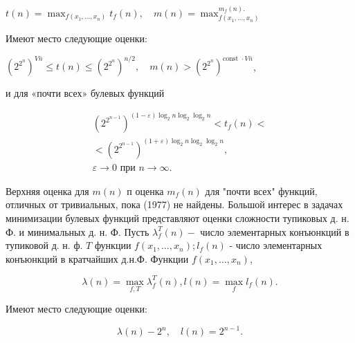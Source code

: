 \documentclass[10pt]{article}
\begin{document}
$t(n)=\max _{f\left(x_{1}, \ldots, x_{n}\right)} t_{f}(n), \quad m(n)=\max _{f\left(x_{1}, \ldots, x_{n}\right)}^{m_{f}(n) .}$



Имеют место следующие оценки:



$\left(2^{2^{n}}\right)^{V \bar{n}} \leqslant t(n) \leqslant\left(2^{2^{n}}\right)^{n / 2}, \quad m(n)>\left(2^{2^{n}}\right)^{\text {const } \cdot V \bar{n}}$,



и для «почти всех» булевых функций



\[

\begin{gathered}

\left(2^{2^{n-1}}\right)^{(1-\varepsilon) \log _{2} n \log _{2} \log _{2} n}<t_{f}(n)< \\

<\left(2^{2^{n-1}}\right)^{(1+\varepsilon) \log _{2} n \log _{2} \log _{2} n}, \\

\varepsilon \longrightarrow 0 \text { при } n \rightarrow \infty .

\end{gathered}

\]



Верхняя оценка для $m(n)$ п оценка $m_{f}(n)$ для "почти всех" функций, отличных от тривиальных, пока (1977) не найдены. Большой интерес в задачах минимизации булевых функций представляют оценки сложности тупиковых д. н. Ф. и минимальных д. н. Ф. Пусть $\lambda_{f}^{T}(n)-$ число элементарных конъюнкций в тупиковой д. н. ф. $T$ функции $f\left(x_{1}, \ldots, x_{n}\right) ; l_{f}(n)$ - число элементарных конъюнкций в кратчайших д.н.Ф. Функции $f\left(x_{1}, \ldots, x_{n}\right)$,



\[

\lambda(n)=\max _{f, T} \lambda_{f}^{T}(n), l(n)=\max _{f} l_{f}(n) .

\]



Имеют место следующие оценки:



\[

\lambda(n)-2^{n}, \quad l(n)=2^{n-1} .

\]
\end{document}

